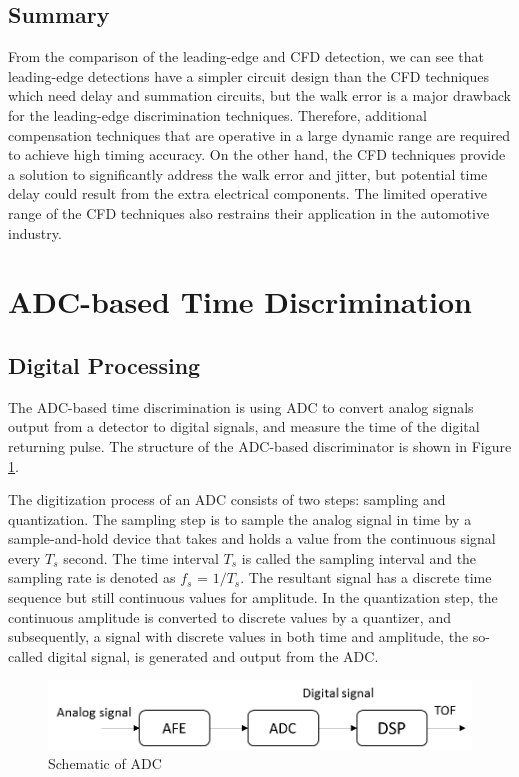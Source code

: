 \subsection{Summary}
From the comparison of the leading-edge and CFD detection, we can see that leading-edge detections have a simpler circuit design than the CFD techniques which need delay and summation circuits, but the walk error is a major drawback for the leading-edge discrimination techniques. Therefore, additional compensation techniques that are operative in a large dynamic range are required to achieve high timing accuracy. On the other hand, the CFD techniques provide a solution to significantly address the walk error and jitter, but potential time delay could result from the extra electrical components. The limited operative range of the CFD techniques also restrains their application in the automotive industry.
\section{ADC-based Time Discrimination}
\subsection{Digital Processing}
The ADC-based time discrimination is using ADC to convert analog signals output from a detector to digital signals, and measure the time of the digital returning pulse. The structure of the ADC-based discriminator is shown in Figure \ref{fig:schematic_ADC}.\par 
The digitization process of an ADC consists of two steps: sampling and quantization. The sampling step is to sample the analog signal in time by a sample-and-hold device that takes and holds a value from the continuous signal every $T_s$ second. The time interval $T_s$ is called the sampling interval and the sampling rate is denoted as $f_s$ = $1/T_s$. The resultant signal has a discrete time sequence but still continuous values for amplitude. In the quantization step, the continuous amplitude is converted to discrete values by a quantizer, and subsequently, a signal with discrete values in both time and amplitude, the so-called digital signal, is generated and output from the ADC.
\begin{figure}
\centering
\includegraphics[width=.8\textwidth]{figures/chapter3_TDC/ADC_schematic.jpg}
\caption{Schematic of ADC}
\label{fig:schematic_ADC}
\end{figure}
